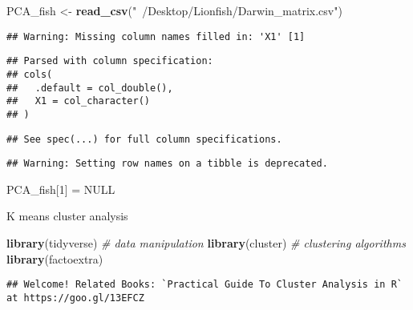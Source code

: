 \documentclass[]{article}
\newenvironment{Shaded}{\begin{snugshade}}{\end{snugshade}}
\newcommand{\KeywordTok}[1]{\textcolor[rgb]{0.13,0.29,0.53}{\textbf{#1}}}
\newcommand{\DecValTok}[1]{\textcolor[rgb]{0.00,0.00,0.81}{#1}}
\newcommand{\StringTok}[1]{\textcolor[rgb]{0.31,0.60,0.02}{#1}}
\newcommand{\CommentTok}[1]{\textcolor[rgb]{0.56,0.35,0.01}{\textit{#1}}}
\newcommand{\OtherTok}[1]{\textcolor[rgb]{0.56,0.35,0.01}{#1}}
\newcommand{\OperatorTok}[1]{\textcolor[rgb]{0.81,0.36,0.00}{\textbf{#1}}}
\newcommand{\NormalTok}[1]{#1}
\begin{document}
\begin{Shaded}
\begin{Highlighting}[]
\NormalTok{PCA_fish <-}\StringTok{ }\KeywordTok{read_csv}\NormalTok{(}\StringTok{"~/Desktop/Lionfish/Darwin_matrix.csv"}\NormalTok{)}
\end{Highlighting}
\end{Shaded}

\begin{verbatim}
## Warning: Missing column names filled in: 'X1' [1]
\end{verbatim}

\begin{verbatim}
## Parsed with column specification:
## cols(
##   .default = col_double(),
##   X1 = col_character()
## )
\end{verbatim}

\begin{verbatim}
## See spec(...) for full column specifications.
\end{verbatim}

\begin{Shaded}
\end{Shaded}

\begin{verbatim}
## Warning: Setting row names on a tibble is deprecated.
\end{verbatim}

\begin{Shaded}
\begin{Highlighting}[]
\NormalTok{PCA_fish[}\DecValTok{1}\NormalTok{] =}\StringTok{ }\OtherTok{NULL}
\end{Highlighting}
\end{Shaded}

K means cluster analysis

\begin{Shaded}
\begin{Highlighting}[]
\KeywordTok{library}\NormalTok{(tidyverse)  }\CommentTok{# data manipulation}
\KeywordTok{library}\NormalTok{(cluster)    }\CommentTok{# clustering algorithms}
\KeywordTok{library}\NormalTok{(factoextra)}
\end{Highlighting}
\end{Shaded}

\begin{verbatim}
## Welcome! Related Books: `Practical Guide To Cluster Analysis in R` at https://goo.gl/13EFCZ
\end{verbatim}
\end{document}

